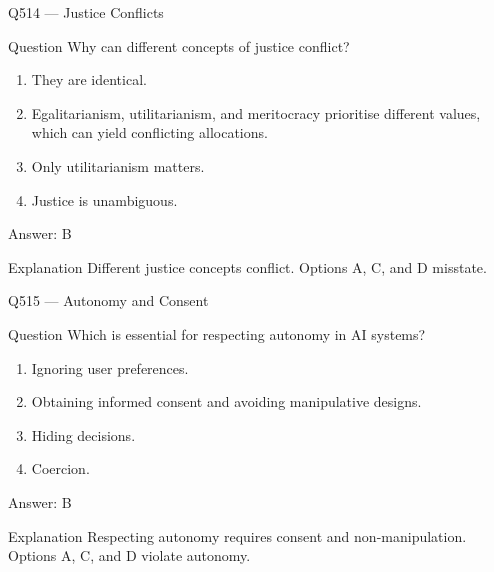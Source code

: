 \documentclass[aspectratio=169,8pt]{beamer}
\begin{document}
	\begin{frame}{Q514 --- Justice Conflicts}
		\begin{block}{Question}
			Why can different concepts of justice conflict?
			\begin{enumerate}
				\item They are identical.
				\item Egalitarianism, utilitarianism, and meritocracy prioritise different values, which can yield conflicting allocations.
				\item Only utilitarianism matters.
				\item Justice is unambiguous.
			\end{enumerate}
		\end{block}
		\begin{exampleblock}{Answer: B}\end{exampleblock}
		\begin{block}{Explanation}
			Different justice concepts conflict. Options A, C, and D misstate.
		\end{block}
	\end{frame}
	
	\begin{frame}{Q515 --- Autonomy and Consent}
		\begin{block}{Question}
			Which is essential for respecting autonomy in AI systems?
			\begin{enumerate}
				\item Ignoring user preferences.
				\item Obtaining informed consent and avoiding manipulative designs.
				\item Hiding decisions.
				\item Coercion.
			\end{enumerate}
		\end{block}
		\begin{exampleblock}{Answer: B}\end{exampleblock}
		\begin{block}{Explanation}
			Respecting autonomy requires consent and non-manipulation. Options A, C, and D violate autonomy.
		\end{block}
	\end{frame}
	
\end{document}
